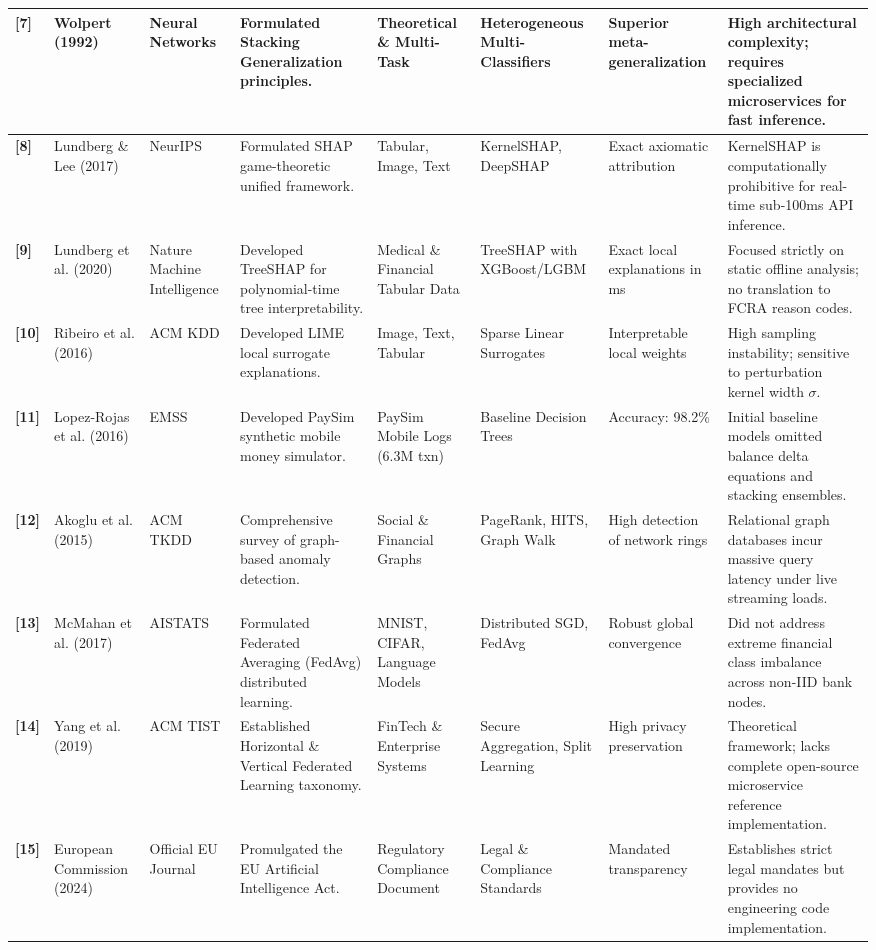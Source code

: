 \documentclass[12pt,a4paper,oneside]{report}
\begin{document}
\begin{table}[H]
\begin{adjustbox}{width=\textwidth,center}
\begin{tabular}{| l | l | l | l | l | l | l | l |}
\textbf{[7]} & Wolpert (1992) & Neural Networks & Formulated Stacking Generalization principles. & Theoretical \& Multi-Task & Heterogeneous Multi-Classifiers & Superior meta-generalization & High architectural complexity; requires specialized microservices for fast inference. \\ \hline
\rowcolor{tablealt} \textbf{[8]} & Lundberg \& Lee (2017) & NeurIPS & Formulated SHAP game-theoretic unified framework. & Tabular, Image, Text & KernelSHAP, DeepSHAP & Exact axiomatic attribution & KernelSHAP is computationally prohibitive for real-time sub-100ms API inference. \\ \hline
\textbf{[9]} & Lundberg et al. (2020) & Nature Machine Intelligence & Developed TreeSHAP for polynomial-time tree interpretability. & Medical \& Financial Tabular Data & TreeSHAP with XGBoost/LGBM & Exact local explanations in ms & Focused strictly on static offline analysis; no translation to FCRA reason codes. \\ \hline
\rowcolor{tablealt} \textbf{[10]} & Ribeiro et al. (2016) & ACM KDD & Developed LIME local surrogate explanations. & Image, Text, Tabular & Sparse Linear Surrogates & Interpretable local weights & High sampling instability; sensitive to perturbation kernel width $\sigma$. \\ \hline
\textbf{[11]} & Lopez-Rojas et al. (2016) & EMSS & Developed PaySim synthetic mobile money simulator. & PaySim Mobile Logs (6.3M txn) & Baseline Decision Trees & Accuracy: 98.2\% & Initial baseline models omitted balance delta equations and stacking ensembles. \\ \hline
\rowcolor{tablealt} \textbf{[12]} & Akoglu et al. (2015) & ACM TKDD & Comprehensive survey of graph-based anomaly detection. & Social \& Financial Graphs & PageRank, HITS, Graph Walk & High detection of network rings & Relational graph databases incur massive query latency under live streaming loads. \\ \hline
\textbf{[13]} & McMahan et al. (2017) & AISTATS & Formulated Federated Averaging (FedAvg) distributed learning. & MNIST, CIFAR, Language Models & Distributed SGD, FedAvg & Robust global convergence & Did not address extreme financial class imbalance across non-IID bank nodes. \\ \hline
\rowcolor{tablealt} \textbf{[14]} & Yang et al. (2019) & ACM TIST & Established Horizontal \& Vertical Federated Learning taxonomy. & FinTech \& Enterprise Systems & Secure Aggregation, Split Learning & High privacy preservation & Theoretical framework; lacks complete open-source microservice reference implementation. \\ \hline
\textbf{[15]} & European Commission (2024) & Official EU Journal & Promulgated the EU Artificial Intelligence Act. & Regulatory Compliance Document & Legal \& Compliance Standards & Mandated transparency & Establishes strict legal mandates but provides no engineering code implementation. \\ \hline
\end{tabular}
\end{adjustbox}
\end{table}
\end{document}
